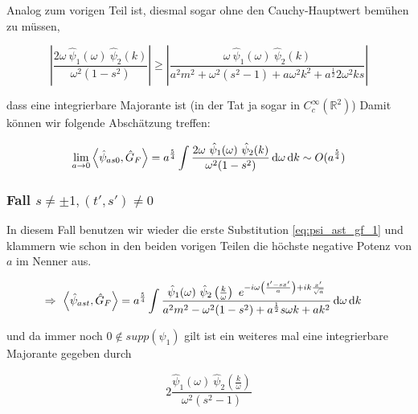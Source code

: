 Analog zum vorigen Teil ist, diesmal sogar ohne den Cauchy-Hauptwert bemühen zu
müssen,


\begin{equation*}
    \left|
        \frac{2 \omega ~\hat \psi_1(\omega) ~\hat \psi_2(k)}{\omega^2 (1-s^2)}
    \right|
    \geq
    \left|
        \frac{
        \omega ~\hat \psi_1(\omega) ~\hat \psi_2(k)
    }
    {
        a^2 m^2+\omega^2 (s^2-1) + a \omega^2 k^2 + a^\frac{1}{2}2 \omega^2 k s
    }
    \right|
\end{equation*}

dass eine integrierbare Majorante ist (in der Tat ja sogar in $C_c^\infty (\mathbb{R}^2)$)
Damit können wir folgende Abschätzung treffen:

\begin{equation*}
    \lim_{a \rightarrow 0} \left< \hat\psi_{as0}, \hat G_F \right> =
    a^\frac{5}{4} \int \frac{2 \omega ~\hat \psi_1(\omega) ~\hat \psi_2(k)}
    {\omega^2 (1-s^2)}
    \mathop{}\!\mathrm{d} \omega \mathop{}\!\mathrm{d} k
    \sim O(a^\frac{5}{4})
\end{equation*}


\subsubsection*{Fall $s \neq \pm 1, (t', s') \neq 0$}
In diesem Fall benutzen wir wieder die erste Substitution \eqref{eq:psi_ast_gf_1}
und klammern wie schon in den beiden vorigen Teilen die höchste negative
Potenz von $a$ im Nenner aus.

\begin{align}
\Rightarrow ~
    \left< \hat\psi_{ast}, \hat G_F \right>
    &=
    a^\frac{5}{4} \int \frac{
        \hat \psi_1 (\omega) ~\hat \psi_2 \left(\frac{k}{\omega}\right)
        ~ e^{-i \omega \left(\frac{t'-sx'}{a}\right) + i k \frac{x'}{\sqrt{a}}}
    }
    {
        a^2 m^2 - \omega^2 (1-s^2) + a^\frac{1}{2} s \omega k +a k^2
    }
    \mathop{}\!\mathrm{d} \omega \mathop{}\!\mathrm{d} k
\end{align}

und da immer noch $0 \notin supp(\psi_1)$ gilt ist ein weiteres mal eine integrierbare Majorante gegeben durch

\begin{equation}
    2\frac{\hat \psi_1 (\omega)~\hat\psi_2 \left(\frac{k}{\omega}\right)}
    {\omega^2(s^2-1)}
\end{equation}

